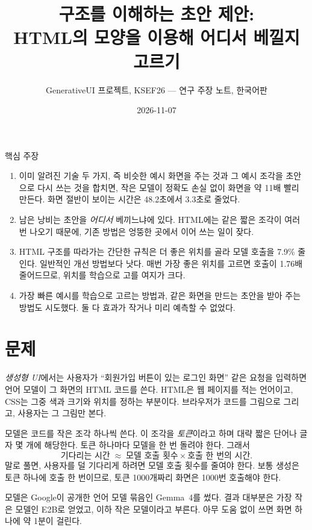 \documentclass[10pt,a4paper]{article}
\title{\textbf{구조를 이해하는 초안 제안:\\HTML의 모양을 이용해 어디서 베낄지 고르기}}
\author{GenerativeUI 프로젝트, KSEF26 --- 연구 주장 노트, 한국어판}
\date{2026-11-07}
\begin{document}
\maketitle

\begin{claimbox}{핵심 주장}
\begin{enumerate}[leftmargin=1.4em,itemsep=2pt]
\item 이미 알려진 기술 두 가지, 즉 비슷한 예시 화면을 주는 것과 그 예시 조각을 초안으로 다시 쓰는 것을 합치면, 작은 모델이 정확도 손실 없이 화면을 약 11배 빨리 만든다. 화면 절반이 보이는 시간은 48.2초에서 3.3초로 줄었다.
\item 남은 낭비는 초안을 \emph{어디서} 베끼느냐에 있다. HTML에는 같은 짧은 조각이 여러 번 나오기 때문에, 기존 방법은 엉뚱한 곳에서 이어 쓰는 일이 잦다.
\item HTML 구조를 따라가는 간단한 규칙은 더 좋은 위치를 골라 모델 호출을 7.9\% 줄인다. 일반적인 개선 방법보다 낫다. 매번 가장 좋은 위치를 고르면 호출이 1.76배 줄어드므로, 위치를 학습으로 고를 여지가 크다.
\item 가장 빠른 예시를 학습으로 고르는 방법과, 같은 화면을 만드는 초안을 받아 주는 방법도 시도했다. 둘 다 효과가 작거나 미리 예측할 수 없었다.
\end{enumerate}
\end{claimbox}

\section{문제}
\emph{생성형 UI}에서는 사용자가 ``회원가입 버튼이 있는 로그인 화면'' 같은 요청을 입력하면 언어 모델이 그 화면의 HTML 코드를 쓴다. HTML은 웹 페이지를 적는 언어이고, CSS는 그중 색과 크기와 위치를 정하는 부분이다. 브라우저가 코드를 그림으로 그리고, 사용자는 그 그림만 본다.

모델은 코드를 작은 조각 하나씩 쓴다. 이 조각을 \emph{토큰}이라고 하며 대략 짧은 단어나 글자 몇 개에 해당한다. 토큰 하나마다 모델을 한 번 돌려야 한다. 그래서
\begin{equation}
\text{기다리는 시간} \;\approx\; \text{모델 호출 횟수} \times \text{호출 한 번의 시간}.
\end{equation}
말로 풀면, 사용자를 덜 기다리게 하려면 모델 호출 횟수를 줄여야 한다. 보통 생성은 토큰 하나에 호출 한 번이므로, 토큰 1000개짜리 화면은 1000번 호출해야 한다.

모델은 Google이 공개한 언어 모델 묶음인 Gemma~4를 썼다. 결과 대부분은 가장 작은 모델인 E2B로 얻었고, 이하 작은 모델이라고 부른다. 아무 도움 없이 쓰면 화면 하나에 약 1분이 걸린다.
\end{document}
